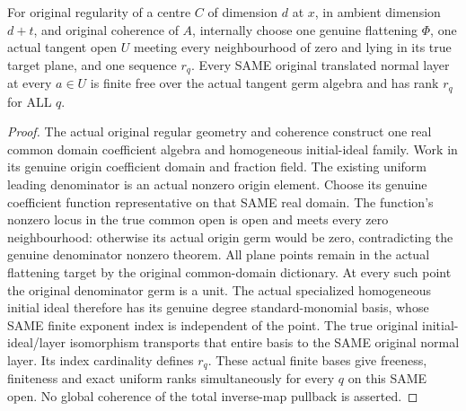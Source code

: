 \begin{theorem}
\label{hir:smooth-centre-real-original-uniform-degree-ranks}
\leanok
For original regularity of a centre $C$ of dimension $d$ at $x$, in ambient
dimension $d+t$, and original coherence of $A$, internally choose one genuine
flattening $\Phi$, one actual tangent open $U$ meeting every neighbourhood
of zero and lying in its true target plane, and one sequence $r_q$.
Every SAME original translated normal layer at every $a\in U$ is finite
free over the actual tangent germ algebra and has rank $r_q$ for ALL $q$.
\end{theorem}
\begin{proof}
The actual original regular geometry and coherence construct one real common
domain coefficient algebra and homogeneous initial-ideal family. Work in
its genuine origin coefficient domain and fraction field. The existing
uniform leading denominator is an actual nonzero origin element. Choose
its genuine coefficient function representative on that SAME real domain.
The function's nonzero locus in the true common open is open and meets
every zero neighbourhood: otherwise its actual origin germ would be zero,
contradicting the genuine denominator nonzero theorem. All plane points
remain in the actual flattening target by the original common-domain
dictionary. At every such point the original denominator germ is a unit.
The actual specialized homogeneous initial ideal therefore has its genuine
degree standard-monomial basis, whose SAME finite exponent index is
independent of the point. The true original initial-ideal/layer isomorphism
transports that entire basis to the SAME original normal layer. Its index
cardinality defines $r_q$. These actual finite bases give freeness, finiteness
and exact uniform ranks simultaneously for every $q$ on this SAME open.
No global coherence of the total inverse-map pullback is asserted.
\end{proof}

